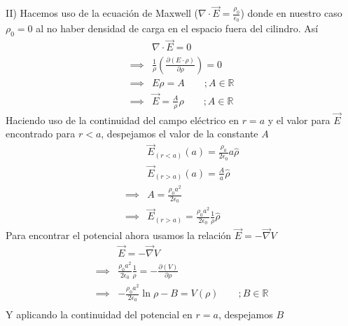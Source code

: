 \begin{enumerate}[label=\alph*)]
    II)  \newline
    Hacemos uso de la ecuación de Maxwell ($\nabla \cdot \vec{E} = \frac{\rho_0}{\epsilon_0}$) donde en nuestro caso $\rho_0 = 0$ al no haber densidad de carga en el espacio fuera del cilindro. Así
    \begin{equation}
        \begin{split}
            &\nabla\cdot\vec{E} = 0\\
            \implies &\frac{1}{\rho}\left( \frac{\partial (E\cdot\rho)}{\partial \rho}\right) = 0\\
            \implies &E\rho = A \quad\quad;A \in \mathbb{R}\\
            \implies &\vec{E} = \frac{A}{\rho}\hat{\rho} \quad\quad;A \in \mathbb{R}
        \end{split}
        \nonumber
    \end{equation}
    Haciendo uso de la continuidad del campo eléctrico en $r = a$ y el valor para $\vec{E}$ encontrado para $r < a$, despejamos el valor de la constante $A$
    \begin{equation}
        \begin{split}
            &\vec{E}_{(r<a)}(a) = \frac{\rho_0}{2\epsilon_0}a\hat{\rho}\\ 
            &\vec{E}_{(r>a)}(a) = \frac{A}{a}\hat{\rho}\\
            \implies &A = \frac{\rho_0a^2}{2\epsilon_0}\\
            \implies &\vec{E}_{(r>a)} = \frac{\rho_0a^2}{2\epsilon_0}\frac{1}{\rho}\hat{\rho}
        \end{split}
        \nonumber
    \end{equation}
    Para encontrar el potencial ahora usamos la relación $\vec{E} = -\vec{\nabla}V$
    \begin{equation}
        \begin{split}
            &\vec{E} = - \vec{\nabla}V\\
            \implies &\frac{\rho_0a^2}{2\epsilon_0}\frac{1}{\rho} = - \frac{\partial (V)}{\partial \rho}\\
            \implies &-\frac{\rho_0a^2}{2\epsilon_0}\ln{\rho} - B = V(\rho) \quad\quad; B \in \mathbb{R}\\
        \end{split}
        \nonumber
    \end{equation}
    Y aplicando la continuidad del potencial en $r =a$, despejamos $B$
    \begin{equation}

\end{equation}
\end{enumerate}
